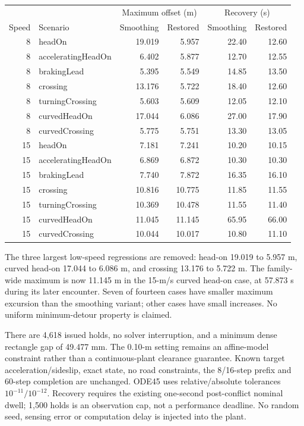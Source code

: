 \documentclass[10pt]{article}
\begin{document}
\begin{center}\small
\begin{tabular}{rlrrrr}\toprule
 & & \multicolumn{2}{c}{Maximum offset (m)} & \multicolumn{2}{c}{Recovery (s)}\\
Speed & Scenario & Smoothing & Restored & Smoothing & Restored\\\midrule
8 & headOn & 19.019 & 5.957 & 22.40 & 12.60 \\
8 & acceleratingHeadOn & 6.402 & 5.877 & 12.70 & 12.55 \\
8 & brakingLead & 5.395 & 5.549 & 14.85 & 13.50 \\
8 & crossing & 13.176 & 5.722 & 18.40 & 12.60 \\
8 & turningCrossing & 5.603 & 5.609 & 12.05 & 12.10 \\
8 & curvedHeadOn & 17.044 & 6.086 & 27.00 & 17.90 \\
8 & curvedCrossing & 5.775 & 5.751 & 13.30 & 13.05 \\
15 & headOn & 7.181 & 7.241 & 10.20 & 10.15 \\
15 & acceleratingHeadOn & 6.869 & 6.872 & 10.30 & 10.30 \\
15 & brakingLead & 7.740 & 7.872 & 16.35 & 16.10 \\
15 & crossing & 10.816 & 10.775 & 11.85 & 11.55 \\
15 & turningCrossing & 10.369 & 10.478 & 11.55 & 11.40 \\
15 & curvedHeadOn & 11.045 & 11.145 & 65.95 & 66.00 \\
15 & curvedCrossing & 10.044 & 10.017 & 10.80 & 11.10 \\
\bottomrule\end{tabular}\end{center}
The three largest low-speed regressions are removed: head-on 19.019 to
5.957 m, curved head-on 17.044 to 6.086 m, and crossing 13.176 to 5.722 m.
The family-wide maximum is now 11.145 m in the 15-m/s curved head-on case,
at 57.873 s during its later encounter. Seven of fourteen cases have smaller
maximum excursion than the smoothing variant; other cases have small
increases. No uniform minimum-detour property is claimed.

There are 4,618 issued holds, no solver interruption, and a minimum dense
rectangle gap of 49.477 mm. The 0.10-m setting remains an affine-model
constraint rather than a continuous-plant clearance guarantee. Known target
acceleration/sideslip, exact state, no road constraints, the 8/16-step prefix
and 60-step completion are unchanged. ODE45 uses relative/absolute tolerances
$10^{-11}/10^{-12}$. Recovery requires the existing one-second post-conflict
nominal dwell; 1,500 holds is an observation cap, not a performance deadline.
No random seed, sensing error or computation delay is injected into the plant.
\end{document}
